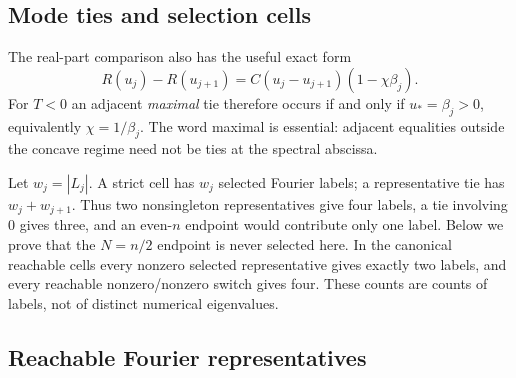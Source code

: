 \documentclass[11pt]{article}
\theoremstyle{definition}
\theoremstyle{remark}
\begin{document}
\subsection{Mode ties and selection cells}
\label{slot:P05-3}
The real-part comparison also has the useful exact form
\begin{equation}
 R(u_j)-R(u_{j+1})
       =C(u_j-u_{j+1})(1-\chi\beta_j).
 \label{eq:P05-adjacent-gap}
\end{equation}
For $T<0$ an adjacent \emph{maximal} tie therefore occurs if and only
if $u_*=\beta_j>0$, equivalently $\chi=1/\beta_j$.
The word maximal is essential: adjacent equalities outside the concave
regime need not be ties at the spectral abscissa.

Let $w_j=|L_j|$. A strict cell has $w_j$ selected Fourier labels; a
representative tie has $w_j+w_{j+1}$. Thus two nonsingleton
representatives give four labels, a tie involving $0$ gives three,
and an even-$n$ endpoint would contribute only one label. Below we prove
that the $N=n/2$ endpoint is never selected here. In the canonical
reachable cells every nonzero selected representative gives exactly two
labels, and every reachable nonzero/nonzero switch gives four.
These counts are counts of labels, not of distinct numerical eigenvalues.

\subsection{Reachable Fourier representatives}
\end{document}
